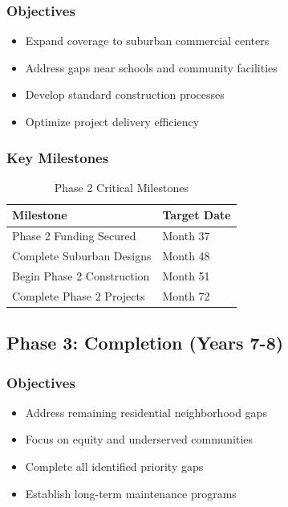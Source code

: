 \documentclass[11pt,letterpaper]{article}
\begin{document}
\subsubsection{Objectives}
\begin{itemize}
    \item Expand coverage to suburban commercial centers
    \item Address gaps near schools and community facilities
    \item Develop standard construction processes
    \item Optimize project delivery efficiency
\end{itemize}

\subsubsection{Key Milestones}
\begin{table}[h]
\centering
\caption{Phase 2 Critical Milestones}
\begin{tabular}{ll}
\toprule
\textbf{Milestone} & \textbf{Target Date} \\
\midrule
Phase 2 Funding Secured & Month 37 \\
Complete Suburban Designs & Month 48 \\
Begin Phase 2 Construction & Month 51 \\
Complete Phase 2 Projects & Month 72 \\
\bottomrule
\end{tabular}
\end{table}

\subsection{Phase 3: Completion (Years 7-8)}

\subsubsection{Objectives}
\begin{itemize}
    \item Address remaining residential neighborhood gaps
    \item Focus on equity and underserved communities
    \item Complete all identified priority gaps
    \item Establish long-term maintenance programs
\end{itemize}
\end{document}
